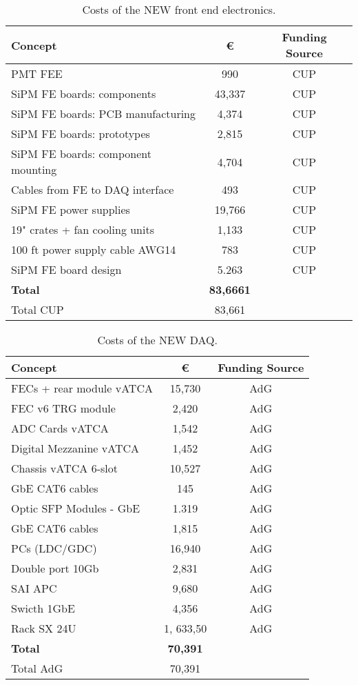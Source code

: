 \begin{table}[h!]
\begin{center}
\begin{tabular}{|l|c|c|}
\hline
 Concept & \euro & Funding Source \\
 \hline
 PMT FEE & 990 & CUP \\
 SiPM FE boards:  components	&	43,337 & CUP \\
SiPM FE boards: PCB manufacturing &	4,374 & CUP \\
SiPM FE boards: prototypes &	2,815 & CUP \\
SiPM FE boards: component mounting &	4,704 & CUP \\
Cables from FE to DAQ interface &	493 & CUP \\
SiPM FE power supplies & 19,766 & CUP \\
19" crates + fan cooling units	& 1,133 & CUP \\
100 ft power supply cable AWG14 &	783 & CUP \\
SiPM FE board design &	5.263 & CUP \\
  \hline
{\bf Total}	&	{\bf 83,6661}	& \\
 Total CUP	&	83,661	& \\
 \hline\hline
\end{tabular}  
\caption{Costs of the NEW front end electronics.}
\label{tab.new:FEE}
\end{center}
\end{table} 

\begin{table}[h!]
\begin{center}
\begin{tabular}{|l|c|c|}
\hline
 Concept & \euro & Funding Source \\
 \hline
FECs + rear module vATCA &	15,730 & AdG \\
FEC v6 TRG module		&	2,420 & AdG \\
ADC Cards vATCA & 	1,542 & AdG \\
Digital Mezzanine vATCA & 1,452 & AdG \\
Chassis vATCA 6-slot	&	10,527 & AdG \\
GbE CAT6 cables		& 145 & AdG \\
Optic SFP Modules - GbE	& 1.319 & AdG \\
GbE CAT6 cables &	1,815 & AdG \\
PCs (LDC/GDC) & 16,940 & AdG \\
Double port 10Gb &	2,831 & AdG \\
SAI	APC	&	9,680 & AdG \\
Swicth 1GbE	& 4,356& AdG \\
Rack SX 24U & 1, 633,50 & AdG \\
  \hline
{\bf Total} &	{\bf 70,391}	& \\
 Total AdG	&	70,391	& \\
 \hline\hline
\end{tabular}  
\caption{Costs of the NEW DAQ.}
\label{tab.new:DAQ}
\end{center}
\end{table} 



